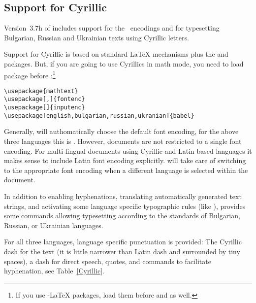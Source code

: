 \subsection{Support for Cyrillic}

Version~3.7h of  includes support for the
~encodings and for typesetting Bulgarian, Russian and
Ukrainian texts using Cyrillic letters.  

Support for Cyrillic is based on standard \LaTeX{} mechanisms plus
the  and  packages. But, if you are going to
use Cyrillics in math mode, you need to load  package
before :\footnote{If you use \AmS-\LaTeX{} packages, 
load them before  and  as well.}
\begin{lscommand}
\verb+\usepackage{mathtext}+\\
\verb+\usepackage[+\verb+,+\verb+]{fontenc}+\\
\verb+\usepackage[+\verb+]{inputenc}+\\
\verb+\usepackage[english,bulgarian,russian,ukranian]{babel}+
\end{lscommand}

Generally,  will authomatically choose the default font encoding,
for the above three languages this is .  However, documents are not
restricted to a single font encoding. For multi-lingual documents using
Cyrillic and Latin-based languages it makes sense to include Latin font
encoding explicitly.  will take care of switching to the appropriate
font encoding when a different language is selected within the document.

In addition to enabling hyphenations, translating automatically
generated text strings, and activating some language specific 
typographic rules (like ),  provides some 
commands allowing typesetting according to the standards of 
Bulgarian, Russian, or Ukrainian languages. 


For all three languages, language specific punctuation is provided:
The Cyrillic dash for the text (it is little narrower than Latin dash and
surrounded by tiny spaces), a dash for direct speech, quotes, and
commands to facilitate hyphenation, see Table~\ref{Cyrillic}.

